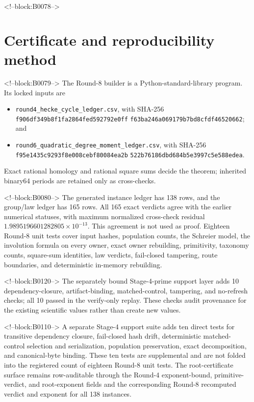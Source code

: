 \documentclass[11pt]{article}
\theoremstyle{definition}
\theoremstyle{remark}
\begin{document}
<!--block:B0078-->
\section{Certificate and reproducibility method}\label{sec:repro}

<!--block:B0079-->
The Round-8 builder is a Python-standard-library program. Its locked inputs are
\begin{itemize}
\item \texttt{round4\_hecke\_cycle\_ledger.csv}, with
\newline SHA-256
\texttt{f906df349b8f1fa2864fed592792e0ff}\newline
\texttt{f63ba246a069179b7bd8cfdf46520662}; and
\item \texttt{round6\_quadratic\_degree\_moment\_ledger.csv}, with
\newline SHA-256
\texttt{f95e1435c9293f8e008cebf80084ea2b}\newline
\texttt{522b76186dbd684b5e3997c5e588edea}.
\end{itemize}
Exact rational homology and rational square sums decide the theorem; inherited binary64 periods are retained only as cross-checks.

<!--block:B0080-->
The generated instance ledger has 138 rows, and the group/law ledger has 165 rows. All 165 exact verdicts agree with the earlier numerical statuses, with maximum normalized cross-check residual $1.9895196601282805\times10^{-13}$. This agreement is not used as proof. Eighteen Round-8 unit tests cover input hashes, population counts, the Schreier model, the involution formula on every owner, exact owner rebuilding, primitivity, taxonomy counts, square-sum identities, law verdicts, fail-closed tampering, route boundaries, and deterministic in-memory rebuilding.

<!--block:B0120-->
The separately bound Stage-4-prime support layer adds 10 dependency-closure, artifact-binding, matched-control, tampering, and no-refresh checks; all 10 passed in the verify-only replay. These checks audit provenance for the existing scientific values rather than create new values.

<!--block:B0110-->
A separate Stage-4 support suite adds ten direct tests for transitive dependency closure, fail-closed hash drift, deterministic matched-control selection and serialization, population preservation, exact decomposition, and canonical-byte binding. These ten tests are supplemental and are not folded into the registered count of eighteen Round-8 unit tests. The root-certificate surface remains row-auditable through the Round-4 exponent-bound, primitive-verdict, and root-exponent fields and the corresponding Round-8 recomputed verdict and exponent for all 138 instances.
\end{document}
